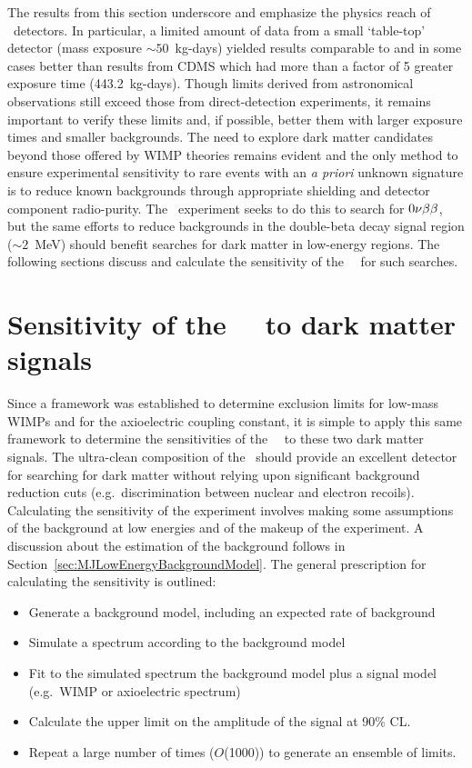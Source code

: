 	The results from this section underscore and emphasize the physics reach of \ppc~detectors.  In particular, a limited amount of data from a small `table-top' detector (mass exposure $\sim50$~kg-days) yielded results comparable to and in some cases better than results from CDMS which had more than a factor of 5 greater exposure time (443.2~kg-days).  Though limits derived from astronomical observations still exceed those from direct-detection experiments, it remains important to verify these limits and, if possible, better them with larger exposure times and smaller backgrounds.  The need to explore dark matter candidates beyond those offered by WIMP theories remains evident and the only method to ensure experimental sensitivity to rare events with an \emph{a priori} unknown signature is to reduce known backgrounds through appropriate shielding and detector component radio-purity.  The \MJ~experiment seeks to do this to search for $0 \nu \beta \beta$, but the same efforts to reduce backgrounds in the double-beta decay signal region ($\sim2$~MeV) should benefit searches for dark matter in low-energy regions.  The following sections discuss and calculate the sensitivity of the \MJ~\minmod~for such searches.
							
	\section{Sensitivity of the \MJ~\minmod~to dark matter signals}
	\label{sec:MJSensitivity}
	
	Since a framework was established to determine exclusion limits for low-mass WIMPs and for the axioelectric coupling constant, it is simple to apply this same framework to determine the sensitivities of the \MJ~\minmod~to these two dark matter signals.  The ultra-clean composition of the \minmod~should provide an excellent detector for searching for dark matter without relying upon significant background reduction cuts (e.g.~discrimination between nuclear and electron recoils).  Calculating the sensitivity of the experiment involves making some assumptions of the background at low energies and of the makeup of the experiment.  A discussion about the estimation of the background follows in Section~\ref{sec:MJLowEnergyBackgroundModel}.  The general prescription for calculating the sensitivity is outlined:
	
		\begin{itemize}
			\item Generate a background model, including an expected rate of background
			\item Simulate a spectrum according to the background model
			\item Fit to the simulated spectrum the background model plus a signal model (e.g.~WIMP or axioelectric spectrum)
			\item Calculate the upper limit on the amplitude of the signal at 90\% CL.
			\item Repeat a large number of times ($O$(1000)) to generate an ensemble of limits.
		\end{itemize}	
		
